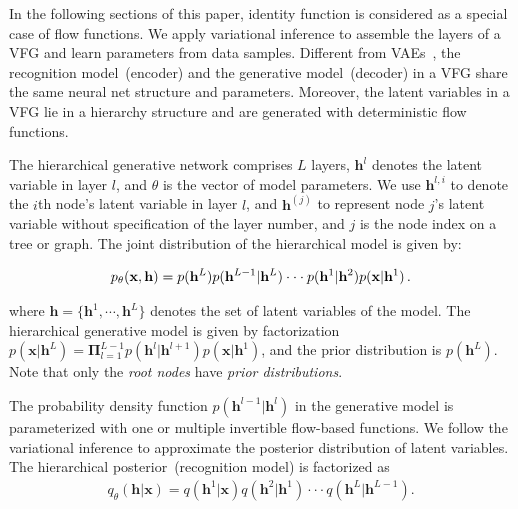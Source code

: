\documentclass[sigconf, anonymous, review]{acmart}
\theoremstyle{plain}
\theoremstyle{definition}
\theoremstyle{remark}
\begin{document}
In the following sections of this paper, identity function is considered as a special case of flow functions.
We apply variational inference to assemble the layers of a VFG and learn parameters from data samples. Different from VAEs~\cite{kingma2013auto,rezende2014stochastic}, the recognition model~(encoder) and the generative model~(decoder) in a VFG share the same  neural net structure and parameters. Moreover, the latent variables in a VFG lie in a hierarchy structure and  are generated with deterministic flow functions.

The hierarchical generative network comprises $L$ layers, $\mathbf{h}^l$ denotes the latent variable in layer $l$, and $\theta$ is the vector of model parameters. We use $\mathbf{h}^{l, i}$ to denote the $i$th node's latent variable  in layer $l$, and $\mathbf{h}^{(j)}$ to represent node $j$'s latent variable without specification of the layer number, and $j$ is the node index on a tree or graph.  
The joint distribution of the hierarchical model is given by:

\vspace{-0.15in}
\begin{align}\notag
p_{\theta}(\mathbf{x}, \mathbf{h}) = p( \mathbf{h}^{L}) p(\mathbf{h}^{L-1} | \mathbf{h}^{L}) \cdot \cdot  \cdot p(\mathbf{h}^{1} | \mathbf{h}^{2})  p(\mathbf{x} | \mathbf{h}^{1}) \, .
\end{align}

\vspace{-0.15in}
\noindent where $\mathbf{h}=\{\mathbf{h}^1, \cdots, \mathbf{h}^L \}$ denotes the set of latent variables of the model. The hierarchical generative model is given by factorization $p(\mathbf{x}|\mathbf{h}^L) =  \mathbf{\Pi}_{l=1}^{L-1}p(\mathbf{h}^{l} | \mathbf{h}^{l+1}) p(\mathbf{x} | \mathbf{h}^{1}) $, and the prior distribution is $p(\mathbf{h}^L)$. Note that only the \emph{root nodes} have \emph{prior distributions}. 

The  probability  density function $p(\mathbf{h}^{l-1} | \mathbf{h}^{l})$ in the generative model is parameterized with one or multiple invertible  flow-based functions.  We follow the variational inference  to approximate the posterior distribution of latent variables. 
The hierarchical posterior~(recognition model) is factorized as
\begin{align}\label{eq:posterior}
q_{\theta}(\mathbf{h}| \mathbf{x}) =  q(\mathbf{h}^1 | \mathbf{x})  q(\mathbf{h}^2 | \mathbf{h}^1) \cdot \cdot  \cdot  q(\mathbf{h}^{L} | \mathbf{h}^{L-1}).
\end{align}
\end{document}
